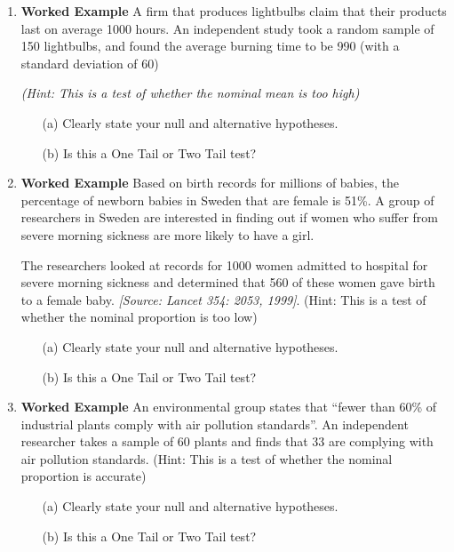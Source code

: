 \documentclass[]{report}
\begin{document}
\begin{enumerate}
\item \textbf{Worked Example}
A firm that produces lightbulbs claim that their products last on average 1000 hours. An independent study took a random sample of 150 lightbulbs, and found the average burning time to be 990 (with a standard deviation of 60)

\textit{(Hint: This is a test of whether the nominal mean is too high)}

\begin{itemize}
\item[(a)] Clearly state your null and alternative hypotheses.
\item[(b)] Is this a One Tail or Two Tail test?
\end{itemize}
\item \textbf{Worked Example}
Based on birth records for millions of babies, the percentage of newborn babies in Sweden that are female is 51\%. A group of researchers in Sweden are interested in finding out if women who suffer from severe morning
sickness are more likely to have a girl. 

The researchers looked at records for 1000 women admitted to hospital for
severe morning sickness and determined that 560 of these women gave birth
to a female baby.  \textit{[Source: Lancet 354: 2053, 1999]}.
(Hint: This is a test of whether the nominal proportion is too low)
\begin{itemize}
\item[(a)] Clearly state your null and alternative hypotheses.
\item[(b)] Is this a One Tail or Two Tail test?
\end{itemize}
\item \textbf{Worked Example}
An environmental group states that “fewer than 60\% of industrial plants comply with air pollution standards”. An independent researcher takes a sample of 60 plants and finds that 33 are complying with air pollution standards. 
(Hint: This is a test of whether the nominal proportion is accurate)
\begin{itemize}
\item[(a)] Clearly state your null and alternative hypotheses.
\item[(b)] Is this a One Tail or Two Tail test?
\end{itemize}


\end{enumerate}
\end{document}

